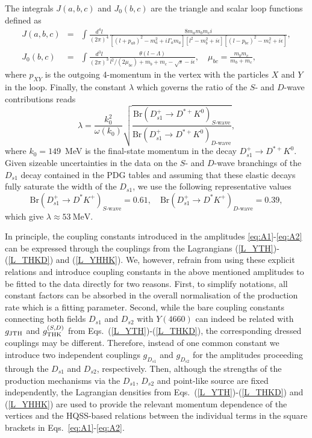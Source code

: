 \documentclass[preprint,12pt,3p]{elsarticle}
\newcommand{\be}{\begin{equation}}
\newcommand{\ee}{\end{equation}}
\newcommand{\bea}{\begin{eqnarray}}
\newcommand{\eea}{\end{eqnarray}}
\newcommand{\Br}{\mbox{Br}}
\begin{document}
The integrals $J(a,b,c)$ and $J_0(b,c)$ are the triangle and scalar loop functions defined as
\bea
J(a,b,c)&=&\int\frac{d^4 l}{(2\pi)^4}\frac{8m_a m_b m_c i}{[(l+p_{ab})^2-m_a^2+i\Gamma_a m_a][l^2-m_b^2+i\epsilon][(l-p_{bc})^2-m_c^2+i\epsilon]},\label{Eq:J}\\
J_0(b,c)&=&\int\frac{d^3 l}{(2\pi)^3}\frac{\theta{(l-\Lambda)}}{l^2/(2\mu_{bc})+m_{b}+m_{c}-\sqrt{s}-i\epsilon},\quad \mu_{bc}=\frac{m_bm_c}{m_b+m_c},
\eea
where $p_{XY}$ is the outgoing 4-momentum in the vertex with the particles $X$ and $Y$ in the loop. Finally, the constant $\lambda$ which governs the ratio of the $S$- and $D$-wave contributions reads
\be
\lambda=\frac{k_0^2}{\omega(k_0)}\sqrt{\frac{\Br(D_{s1}^+\to D^{*+}K^0)_{S\text{-wave}}}{\Br(D_{s1}^+\to D^{*+}K^0)_{D\text{-wave}}}},
\ee
where $k_0=149$~MeV is the final-state momentum in the decay $D_{s1}^+\to D^{*+}K^0$. Given sizeable uncertainties in the data on the $S$- and $D$-wave branchings of the $D_{s1}$ decay contained in the PDG tables \cite{Zyla:2020zbs} and assuming that these elastic decays fully saturate the width of the $D_{s1}$, we use the following representative 
values
\be
\Br(D_{s1}^+\to D^*K^+)_{S\text{-wave}}=0.61,\quad \Br(D_{s1}^+\to D^*K^+)_{D\text{-wave}}=0.39,
\ee
which give $\lambda\approx 53~\mbox{MeV}.$

In principle, the coupling constants introduced in the amplitudes \eqref{eq:A1}-\eqref{eq:A2} can be expressed through the couplings from the Lagrangians (\ref{L_YTH})-(\ref{L_THKD}) and (\ref{L_YHHK}). We, however, refrain from using these explicit relations and introduce coupling constants in the above mentioned amplitudes to be fitted to the data directly for two reasons. First, to simplify notations, all constant factors can be absorbed in the overall normalisation of the production rate which is a fitting parameter. Second, while the bare coupling constants connecting both fields $D_{s1}$ and $D_{s2}$ with $Y(4660)$ can indeed be related with $g_{\rm JT H}$ and $g_{\rm THK}^{(S,D)}$ from Eqs.~(\ref{L_YTH})-(\ref{L_THKD}), the corresponding dressed couplings may be different. Therefore, instead of one common constant we introduce two independent couplings $g_{D_{s1}}$ and $g_{D_{s2}}$ for the amplitudes proceeding through the $D_{s1}$ and $D_{s2}$, respectively.  
Then, although the strengths of the production mechanisms via the $D_{s1}$, $D_{s2}$ and point-like source are fixed independently, 
 the Lagrangian densities from Eqs.~(\ref{L_YTH})-(\ref{L_THKD}) and (\ref{L_YHHK}) are used 
to provide the relevant momentum dependence of the vertices and the HQSS-based relations between the individual terms in the square brackets in Eqs.~\eqref{eq:A1}-\eqref{eq:A2}.
\end{document}

